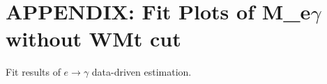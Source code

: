 \section{APPENDIX: Fit Plots of M_{e$\gamma$} without WMt cut}
\label{sec:EtogammaFitPlotsNoWMtCut}

Fit results of $e \rightarrow \gamma$ data-driven estimation.

  


